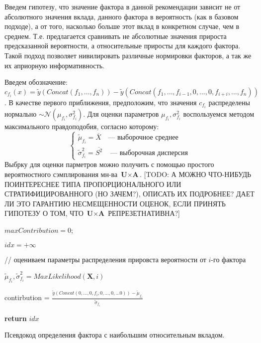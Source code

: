 \documentclass[12pt,a4paper]{report}
\begin{document}
Введем гипотезу, что значение фактора в данной рекомендации зависит не от абсолютного значения вклада, данного фактора в вероятность (как в базовом подходе), а от того, насколько больше этот вклад в конкретном случае, чем в среднем. Т.е. предлагается сравнивать не абсолютные значения прироста предсказанной вероятности, а относительные приросты для каждого фактора. Такой подход позволяет нивилировать различные нормировки факторов, а так же их априорную информативность.

Введем обозначение: $c_{f_i}(x) = \tilde{y}(Concat(f_1, \dots, f_n)) - \tilde{y}(Concat(f_1, \dots, f_{i-1}, 0, \dots, 0, f_{i+i}, \dots, f_n)) $. В качестве первого приближения, предположим, что значения $c_{f_i}$ распределены нормально $\sim\mathcal{N}(\mu_{f_i}, \sigma_{f_i}^2)$.
Для оценки параметров $\mu_{f_i}, \sigma_{f_i}^2$ воспользуемся методом максимального правдоподобия, согласно которому:
\begin{equation*}
\begin{cases}
\tilde{\mu}_{f_i} = \overline{X} &\text{--- выборочное среднее} 
\\ \tilde{\sigma}_{f_i}^2 = \overline{S^2} &\text{ --- выборочная дисперсия}
\end{cases}
\end{equation*}
Выбрку для оценки парметров можно получить с помощью простого вероятностного сэмплирования мн-ва $\textbf{U} \times \textbf{A}$. [TODO: А МОЖНО ЧТО-НИБУДЬ ПОИНТЕРЕСНЕЕ ТИПА ПРОПОРЦИОНАЛЬНОГО ИЛИ СТРАТИФИЦИРОВАННОГО (НО ЗАЧЕМ?), ОПИСАТЬ ИХ ПОДРОБНЕЕ? ДАЕТ ЛИ ЭТО ГАРАНТИЮ НЕСМЕЩЕННОСТИ ОЦЕНОК, ЕСЛИ ПРИНЯТЬ ГИПОТЕЗУ О ТОМ, ЧТО  $\textbf{U} \times \textbf{A}$ РЕПРЕЗЕТНАТИВНА?]

\begin{algorithm}[H]
\SetAlgoLined
{}

$maxContribution = 0$;

$idx = +\infty$

 {

// оцениваем параметры распределения прировста вероятности от $i$-го фактора

$\tilde{\mu}_{f_i}, \tilde{\sigma}_{f_i}^2 = MaxLikelihood(\textbf{X}, i)$

contirbution = $\frac{\tilde{y}(Concat(0, \dots, 0, f_{i}, 0, \dots, 0, \dots 0)) - \tilde{\mu}_{f_i}}{\tilde{\sigma}_{f_i}}$

}

\textbf{return} $idx$
\caption{Псевдокод определения фактора с наибольшим относительным вкладом.}
\label{alg:naiveAI}
\end{algorithm}
\end{document}
